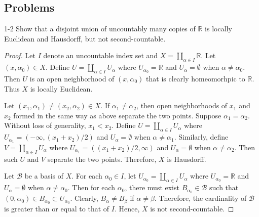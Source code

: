 \subsection{Problems}

\begin{customprob}{1-2}
  Show that a disjoint union of uncountably many copies of $\mathbb{R}$ is locally Euclidean and Hausdorff, but not second-countable.
\end{customprob}

\begin{proof}
  Let $I$ denote an uncountable index set and $X = \coprod_{\alpha \in I} \mathbb{R}$.
  Let $(x, \alpha_0) \in X$.
  Define $U = \coprod_{\alpha \in I} U_{\alpha}$ where $U_{\alpha_0} = \mathbb{R}$ and $U_{\alpha} = \emptyset$ when $\alpha \ne \alpha_0$.
  Then $U$ is an open neighborhood of $(x, \alpha_0)$ that is clearly homeomorhpic to $\mathbb{R}$.
  Thus $X$ is locally Euclidean.

  Let $(x_1, \alpha_1) \ne (x_2, \alpha_2) \in X$.
  If $\alpha_1 \ne \alpha_2$, then open neighborhoods of $x_1$ and $x_2$ formed in the same way as above separate the two points.
  Suppose $\alpha_1 = \alpha_2$.
  Without loss of generality, $x_1 < x_2$.
  Define $U = \coprod_{\alpha \in I} U_{\alpha}$ where $U_{\alpha_1} = (-\infty, (x_1 + x_2) / 2)$ and $U_{\alpha} = \emptyset$ when $\alpha \ne \alpha_1$.
  Similarly, define $V = \coprod_{\alpha \in I} U_{\alpha}$ where $U_{\alpha_1} = ((x_1 + x_2) / 2, \infty)$ and $U_{\alpha} = \emptyset$ when $\alpha \ne \alpha_2$.
  Then such $U$ and $V$ separate the two points.
  Therefore, $X$ is Hausdorff.

  Let $\mathcal{B}$ be a basis of $X$.
  For each $\alpha_0 \in I$, let $U_{\alpha_0} = \coprod_{\alpha \in I} U_{\alpha}$ where $U_{\alpha_0} = \mathbb{R}$ and $U_{\alpha} = \emptyset$ when $\alpha \ne \alpha_0$.
  Then for each $\alpha_0$, there must exist $B_{\alpha_0} \in \mathcal{B}$ such that $(0, \alpha_0) \in B_{\alpha_0} \subset U_{\alpha_0}$.
  Clearly, $B_{\alpha} \ne B_{\beta}$ if $\alpha \ne \beta$.
  Therefore, the cardinality of $\mathcal{B}$ is greater than or equal to that of $I$.
  Hence, $X$ is not second-countable.
\end{proof}

